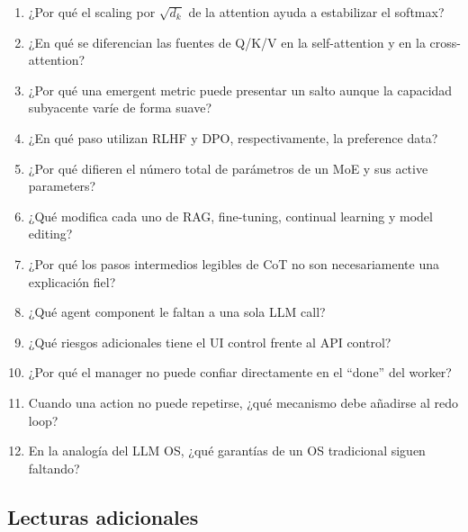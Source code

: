 \begin{enumerate}
  \item ¿Por qué el scaling por $\sqrt{d_k}$ de la attention ayuda a estabilizar el softmax?
  \item ¿En qué se diferencian las fuentes de Q/K/V en la self-attention y en la cross-attention?
  \item ¿Por qué una emergent metric puede presentar un salto aunque la capacidad subyacente varíe de forma suave?
  \item ¿En qué paso utilizan RLHF y DPO, respectivamente, la preference data?
  \item ¿Por qué difieren el número total de parámetros de un MoE y sus active parameters?
  \item ¿Qué modifica cada uno de RAG, fine-tuning, continual learning y model editing?
  \item ¿Por qué los pasos intermedios legibles de CoT no son necesariamente una explicación fiel?
  \item ¿Qué agent component le faltan a una sola LLM call?
  \item ¿Qué riesgos adicionales tiene el UI control frente al API control?
  \item ¿Por qué el manager no puede confiar directamente en el ``done'' del worker?
  \item Cuando una action no puede repetirse, ¿qué mecanismo debe añadirse al redo loop?
  \item En la analogía del LLM OS, ¿qué garantías de un OS tradicional siguen faltando?
\end{enumerate}

\subsection{Lecturas adicionales}

